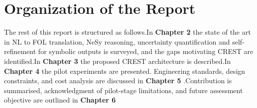 \section{Organization of the Report}

The rest of this report is structured as follows.In \textbf{Chapter 2}  the state of the art  in NL to FOL translation, NeSy reasoning, uncertainty quantification and self-refinement for symbolic outputs is surveyed, and the gaps motivating CREST are identified.In  \textbf{Chapter 3}  the proposed CREST architecture is described.In \textbf{Chapter 4}  the pilot experiments are presented. Engineering standards, design constraints, and cost analysis are discussed in \textbf{Chapter 5} .Contribution is summarised, acknowledgment of pilot-stage limitations, and future assessment objective are outlined in \textbf{Chapter 6} 